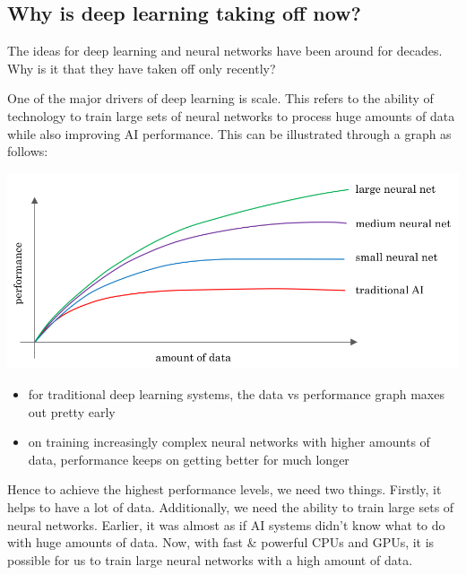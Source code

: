 \documentclass{article}[a4paper,12pt]
\theoremstyle{definition}
\begin{document}
\subsection{Why is deep learning taking off now?}
The ideas for deep learning and neural networks have been around for decades. Why is it that they have taken off only recently?
\vspace{6pt}

One of the major drivers of deep learning is scale. This refers to the ability of technology to train large sets of neural networks to process huge amounts of data while also improving AI performance. This can be illustrated through a graph as follows:
\begin{center}\includegraphics[scale=0.65]{data_vs_performance.png}\end{center}
\begin{itemize}
	\item for traditional deep learning systems, the data vs performance graph maxes out pretty early
	\item on training increasingly complex neural networks with higher amounts of data, performance keeps on getting better for much longer  
\end{itemize}
Hence to achieve the highest performance levels, we need two things. Firstly, it helps to have a lot of data. Additionally, we need the ability to train large sets of neural networks. Earlier, it was almost as if AI systems didn't know what to do with huge amounts of data. Now, with fast \& powerful CPUs and GPUs, it is possible for us to train large neural networks with a high amount of data.
\vspace{6pt}
\end{document}
